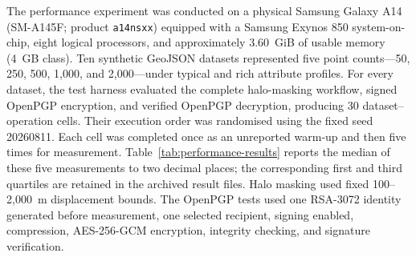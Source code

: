 \documentclass[]{interact}
\begin{document}
%

The performance experiment was conducted on a physical Samsung Galaxy A14 (SM-A145F; product \texttt{a14nsxx}) equipped with a Samsung Exynos 850 system-on-chip, eight logical processors, and approximately 3.60~GiB of usable memory (4~GB class). Ten synthetic GeoJSON datasets represented five point counts---50, 250, 500, 1,000, and 2,000---under typical and rich attribute profiles. For every dataset, the test harness evaluated the complete halo-masking workflow, signed OpenPGP encryption, and verified OpenPGP decryption, producing 30 dataset--operation cells. Their execution order was randomised using the fixed seed 20260811. Each cell was completed once as an unreported warm-up and then five times for measurement. Table~\ref{tab:performance-results} reports the median of these five measurements to two decimal places; the corresponding first and third quartiles are retained in the archived result files. Halo masking used fixed 100--2,000~m displacement bounds. The OpenPGP tests used one RSA-3072 identity generated before measurement, one selected recipient, signing enabled, compression, AES-256-GCM encryption, integrity checking, and signature verification.
\end{document}
